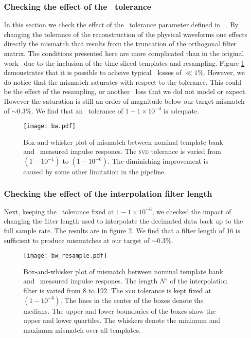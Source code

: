 \subsubsection{Checking the effect of the \SVD\ tolerance}

In this section we check the effect of the \SVD\ tolerance parameter defined in
~\cite{Cannon:2010p10398}.  By changing the tolerance of the reconstruction of
the physical waveforms one effects directly the mismatch that results from the
truncation of the orthogonal filter matrix.  The conditions presented here are
more complicated than in the original work~\cite{Cannon:2010p10398} due to the
inclusion of the time sliced templates and resampling.    Figure \ref{fig:hist-svd-tolerance}
demonstrates that it is possible to acheive typical \SNR\ losses of $\ll1\%$.
However, we do notice that the mismatch saturates with respect to the tolerance.
This could be the effect of the resampling, or another \SNR\ loss that we did
not model or expect.  However the saturation is still an order of magnitude below our target mismatch of $\sim 0.3 \%$.  We find that an \SVD\ tolerance of
$1-1\times10^{-4}$ is adequate. 
%
\begin{figure}
	\begin{center}
		\texttt{[image: bw.pdf]}
		\caption{\label{fig:hist-svd-tolerance}
Box-and-whisker plot of mismatch between nominal
template bank and \lloid\ measured impulse respones.  The \textsc{svd}
tolerance is varied from $\left(1-10^{-1}\right)$ to $\left(1-10^{-6}\right)$.
The diminishing improvement is caused by some other limitation in the pipeline.}
	\end{center}
\end{figure}

\subsubsection{Checking the effect of the interpolation filter length}

Next, keeping the \SVD\ tolerance fixed at $1-1\times10^{-6}$, we checked the
impact of changing the filter length used to interpolate the decimated data
back up to the full sample rate.  The results are in figure
\ref{fig:hist-interpolate}.  We find that a filter length of 16 is sufficient
to produce mismatches at our target of $\sim 0.3 \%$.
%
\begin{figure}
	\begin{center}
		\texttt{[image: bw\_resample.pdf]}
		\caption{\label{fig:hist-interpolate} Box-and-whisker plot of
mismatch between nominal template bank and \lloid\ measured impulse respones.
The length $N^\uparrow$ of the interpolation filter is varied from 8 to 192.
The \textsc{svd} tolerance is kept fixed at $(1-10^{-6})$.  The lines in the
center of the boxes denote the medians.  The upper and lower boundaries of the
boxes show the upper and lower quartiles.  The whiskers denote the minimum and
maximum mismatch over all templates.}
	\end{center}
\end{figure}



